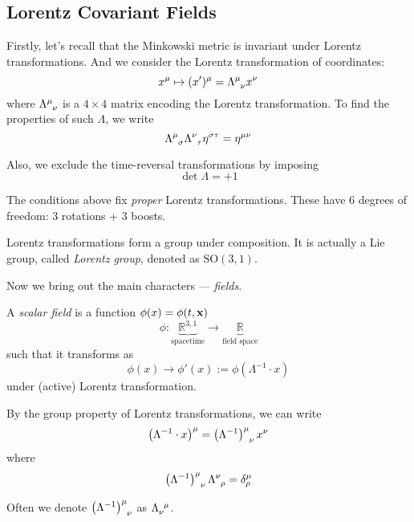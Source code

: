 \documentclass[a4paper,11pt]{article}
\begin{document}
	\subsection{Lorentz Covariant Fields}

	Firstly, let's recall that the Minkowski metric is invariant under Lorentz transformations. And we consider the Lorentz transformation of coordinates:
	\begin{equation}
		x^\mu \mapsto (x')^\mu = \LT{\mu}{\nu}x^\nu
	\end{equation}
	where $\LT{\mu}{\nu}$ is a $4\times 4$ matrix encoding the Lorentz transformation. To find the properties of such $\Lambda$, we write
	\begin{equation}
		\LT{\mu}{\sigma}\LT{\nu}{\tau} \eta^{\sigma\tau} = \eta^{\mu\nu}
	\end{equation}

	Also, we exclude the time-reversal transformations by imposing
	\[
		\det \Lambda = + 1
	\]
	
	The conditions above fix \emph{proper} Lorentz transformations. These have 6 degrees of freedom: 3 rotations + 3 boosts. 

	Lorentz transformations form a group under composition. It is actually a Lie group, called \emph{Lorentz group}, denoted as $\mathrm{SO}(3,1)$.
	
	Now we bring out the main characters --- \emph{fields}.

	\begin{defi}
		A \emph{scalar field} is a function $\phi(x) = \phi(t, \vb x)$
		\[
			\phi : \underbrace{\mathbb{R}^{3,1}}_{\text{spacetime}} \to \underbrace{ \mathbb{R}}_{\text{field space}}
		\]
		such that it transforms as 
		\begin{equation}
			\phi(x) \to \phi'(x) := \phi(\Lambda^{-1} \cdot x)
		\end{equation}
		under (active) Lorentz transformation.
	\end{defi}

	\begin{nt}
		By the group property of Lorentz transformations, we can write
		\[
			\left( \Lambda^{-1} \cdot x \right)^\mu = \left( \Lambda^{-1} \right)\indices{^\mu_\nu} x^\nu
		\]
		where
		\[
			\left( \Lambda^{-1} \right)\indices{^\mu_\nu} \LT{\nu}{\rho} = \delta_\rho^\mu
		\]

		Often we denote $\left( \Lambda^{-1} \right)\indices{^\mu_\nu}$ as $\iLT{\nu}{\mu}$.
	\end{nt}
\end{document}
